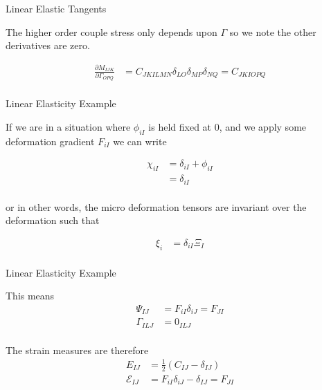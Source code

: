 \documentclass[11pt]{beamer}
\begin{document}
\begin{frame}{Linear Elastic Tangents}

The higher order couple stress only depends upon $\Gamma$ so we note the other derivatives are zero.

\begin{align*}
\frac{\partial M_{IJK}}{\partial \Gamma_{OPQ}} &= C_{JKILMN} \delta_{LO} \delta_{MP} \delta_{NQ} = C_{JKIOPQ}\\
\end{align*}

\end{frame}

\begin{frame}{Linear Elasticity Example}

If we are in a situation where $\phi_{iI}$ is held fixed at 0, and we apply some deformation gradient $F_{iI}$ we can write

\begin{align*}
\chi_{iI} &= \delta_{iI} + \phi_{iI}\\
&= \delta_{iI}\\
\end{align*}

or in other words, the micro deformation tensors are invariant over the deformation such that

\begin{align*}
\xi_{i} &= \delta_{iI} \Xi_{I}\\
\end{align*}

\end{frame}

\begin{frame}{Linear Elasticity Example}

This means
\begin{align*}
\Psi_{IJ} &= F_{iI} \delta_{iJ} = F_{JI}\\
\Gamma_{ILJ} &= 0_{ILJ}\\
\end{align*}

The strain measures are therefore
\begin{align*}
E_{IJ} &= \frac{1}{2} \left(C_{IJ} - \delta_{IJ}\right)\\
\mathcal{E}_{IJ} &= F_{iI} \delta_{iJ} - \delta_{IJ} = F_{JI}\\
\end{align*}

\end{frame}
\end{document}
